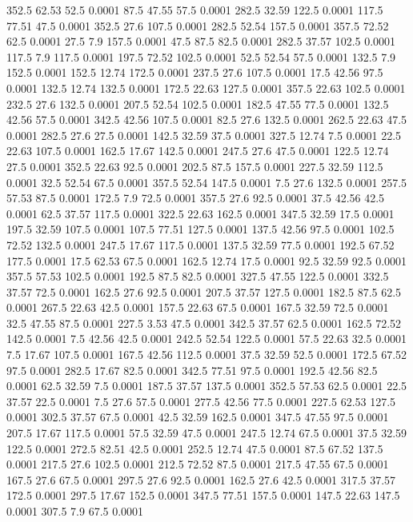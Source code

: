 352.5	62.53	52.5	0.0001
87.5	47.55	57.5	0.0001
282.5	32.59	122.5	0.0001
117.5	77.51	47.5	0.0001
352.5	27.6	107.5	0.0001
282.5	52.54	157.5	0.0001
357.5	72.52	62.5	0.0001
27.5	7.9	157.5	0.0001
47.5	87.5	82.5	0.0001
282.5	37.57	102.5	0.0001
117.5	7.9	117.5	0.0001
197.5	72.52	102.5	0.0001
52.5	52.54	57.5	0.0001
132.5	7.9	152.5	0.0001
152.5	12.74	172.5	0.0001
237.5	27.6	107.5	0.0001
17.5	42.56	97.5	0.0001
132.5	12.74	132.5	0.0001
172.5	22.63	127.5	0.0001
357.5	22.63	102.5	0.0001
232.5	27.6	132.5	0.0001
207.5	52.54	102.5	0.0001
182.5	47.55	77.5	0.0001
132.5	42.56	57.5	0.0001
342.5	42.56	107.5	0.0001
82.5	27.6	132.5	0.0001
262.5	22.63	47.5	0.0001
282.5	27.6	27.5	0.0001
142.5	32.59	37.5	0.0001
327.5	12.74	7.5	0.0001
22.5	22.63	107.5	0.0001
162.5	17.67	142.5	0.0001
247.5	27.6	47.5	0.0001
122.5	12.74	27.5	0.0001
352.5	22.63	92.5	0.0001
202.5	87.5	157.5	0.0001
227.5	32.59	112.5	0.0001
32.5	52.54	67.5	0.0001
357.5	52.54	147.5	0.0001
7.5	27.6	132.5	0.0001
257.5	57.53	87.5	0.0001
172.5	7.9	72.5	0.0001
357.5	27.6	92.5	0.0001
37.5	42.56	42.5	0.0001
62.5	37.57	117.5	0.0001
322.5	22.63	162.5	0.0001
347.5	32.59	17.5	0.0001
197.5	32.59	107.5	0.0001
107.5	77.51	127.5	0.0001
137.5	42.56	97.5	0.0001
102.5	72.52	132.5	0.0001
247.5	17.67	117.5	0.0001
137.5	32.59	77.5	0.0001
192.5	67.52	177.5	0.0001
17.5	62.53	67.5	0.0001
162.5	12.74	17.5	0.0001
92.5	32.59	92.5	0.0001
357.5	57.53	102.5	0.0001
192.5	87.5	82.5	0.0001
327.5	47.55	122.5	0.0001
332.5	37.57	72.5	0.0001
162.5	27.6	92.5	0.0001
207.5	37.57	127.5	0.0001
182.5	87.5	62.5	0.0001
267.5	22.63	42.5	0.0001
157.5	22.63	67.5	0.0001
167.5	32.59	72.5	0.0001
32.5	47.55	87.5	0.0001
227.5	3.53	47.5	0.0001
342.5	37.57	62.5	0.0001
162.5	72.52	142.5	0.0001
7.5	42.56	42.5	0.0001
242.5	52.54	122.5	0.0001
57.5	22.63	32.5	0.0001
7.5	17.67	107.5	0.0001
167.5	42.56	112.5	0.0001
37.5	32.59	52.5	0.0001
172.5	67.52	97.5	0.0001
282.5	17.67	82.5	0.0001
342.5	77.51	97.5	0.0001
192.5	42.56	82.5	0.0001
62.5	32.59	7.5	0.0001
187.5	37.57	137.5	0.0001
352.5	57.53	62.5	0.0001
22.5	37.57	22.5	0.0001
7.5	27.6	57.5	0.0001
277.5	42.56	77.5	0.0001
227.5	62.53	127.5	0.0001
302.5	37.57	67.5	0.0001
42.5	32.59	162.5	0.0001
347.5	47.55	97.5	0.0001
207.5	17.67	117.5	0.0001
57.5	32.59	47.5	0.0001
247.5	12.74	67.5	0.0001
37.5	32.59	122.5	0.0001
272.5	82.51	42.5	0.0001
252.5	12.74	47.5	0.0001
87.5	67.52	137.5	0.0001
217.5	27.6	102.5	0.0001
212.5	72.52	87.5	0.0001
217.5	47.55	67.5	0.0001
167.5	27.6	67.5	0.0001
297.5	27.6	92.5	0.0001
162.5	27.6	42.5	0.0001
317.5	37.57	172.5	0.0001
297.5	17.67	152.5	0.0001
347.5	77.51	157.5	0.0001
147.5	22.63	147.5	0.0001
307.5	7.9	67.5	0.0001
